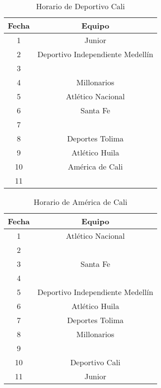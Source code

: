 \documentclass[11pt]{article}
\begin{document}
\begin{multicols}{2}
            \begin{table}[H]
                \centering
                \begin{tabular}{|c||c|}
                    \hline
                    Fecha & Equipo\\ \hline
                    1 & Junior \\ \hline
                    2 & Deportivo Independiente Medellín \\ \hline
                    3 &  \\ \hline
                    4 & Millonarios \\ \hline
                    5 & Atlético Nacional \\ \hline
                    6 & Santa Fe \\ \hline
                    7 &  \\ \hline
                    8 & Deportes Tolima  \\ \hline
                    9 & Atlético Huila\\ \hline
                    10 & América de Cali \\ \hline
                    11 &  \\ \hline
                \end{tabular} 
                \caption{Horario de Deportivo Cali}
            \end{table}

            \begin{table}[H]
                \centering
                \begin{tabular}{|c||c|}
                    \hline
                    Fecha & Equipo\\ \hline
                    1 & Atlético Nacional\\ \hline
                    2 &  \\ \hline
                    3 & Santa Fe \\ \hline
                    4 &  \\ \hline
                    5 & Deportivo Independiente Medellín \\ \hline
                    6 & Atlético Huila \\ \hline
                    7 & Deportes Tolima  \\ \hline
                    8 & Millonarios\\ \hline
                    9 & \\ \hline
                    10 & Deportivo Cali \\ \hline
                    11 & Junior \\ \hline
                \end{tabular} 
                \caption{Horario de América de Cali}
            \end{table}


\end{multicols}
\end{document}
